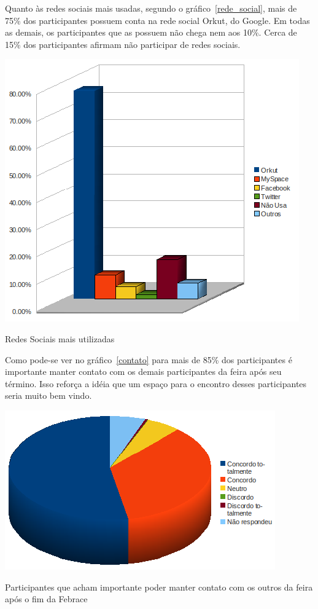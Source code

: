     Quanto às redes sociais mais usadas, segundo o gráfico~\ref{rede_social}, mais de 75\% dos participantes possuem conta na rede social Orkut, do Google. Em todas as demais, os participantes que as possuem não chega nem aos 10\%. Cerca de 15\% dos participantes afirmam não participar de redes sociais.

    \begin{grafico}
        \begin{center}
    \includegraphics[width=0.7\linewidth]{arquivos/rede_social.png}
        \end{center}
        \caption{Redes Sociais mais utilizadas}
        \label{rede_social}
    \end{grafico}

    Como pode-se ver no gráfico~\ref{contato} para mais de 85\% dos participantes é importante manter contato com os demais participantes da feira após seu término. Isso reforça a idéia que um espaço para o encontro desses participantes seria muito bem vindo.

    \begin{grafico}
        \begin{center}
    \includegraphics[width=0.7\linewidth]{arquivos/contato.png}
        \end{center}
        \caption{Participantes que acham importante poder manter contato com os outros da feira após o fim da Febrace}
        \label{contato}
    \end{grafico}


